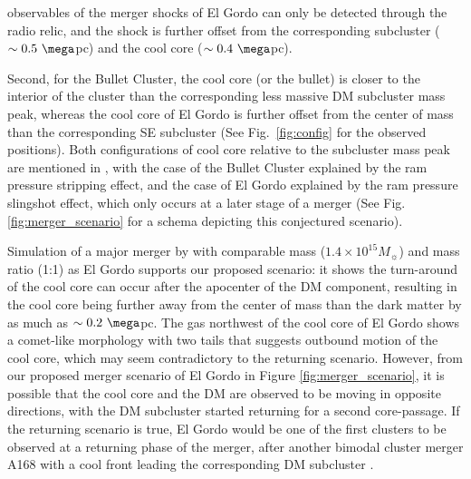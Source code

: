 observables of the merger shocks of El Gordo can only be detected through the radio relic, and the shock is
further offset from the corresponding subcluster ($\sim 0.5~\mega$pc) and
the cool core ($\sim 0.4~\mega$pc). \par
Second, for the Bullet Cluster, the cool core (or the bullet) is closer to the
interior of the cluster than the corresponding less massive DM subcluster mass
peak, whereas the cool core of El Gordo is further offset from the center of
mass than the corresponding SE subcluster (See Fig.~\ref{fig:config} for
the observed positions). 
Both configurations of cool core relative to the subcluster mass peak are
mentioned in \cite{Markevitch2007}, with the case of the Bullet Cluster
explained by the ram pressure stripping effect, and the case of El Gordo
explained by the ram pressure slingshot effect, which only occurs at a
later stage of a merger (See Fig. \ref{fig:merger_scenario} for a schema depicting this conjectured scenario).\par 
Simulation of a major merger by
\cite{Mathis05} with comparable mass ($1.4 \times 10^{15} M_{\sun}$) and
mass ratio (1:1) as El Gordo supports
our proposed scenario: it shows the turn-around of the cool core can occur after the
apocenter of the DM component, resulting in the cool core being further
away from the center of mass than the dark matter by as much as $\sim
0.2~\mega$pc.  The gas northwest of the cool core of El Gordo shows a comet-like
morphology with two tails that suggests outbound motion of the cool core, which may seem
contradictory to the returning scenario. However, from our proposed merger
scenario of El Gordo in Figure \ref{fig:merger_scenario},
it is possible that the cool core and the DM are observed to be moving in
opposite directions, with the DM subcluster started returning for a second core-passage. If the returning scenario is true, El Gordo would be one of the first
clusters to be observed at a returning phase of the merger, after another
bimodal cluster merger A168 with a cool front leading the corresponding DM
subcluster \citep{Hallman04}.

